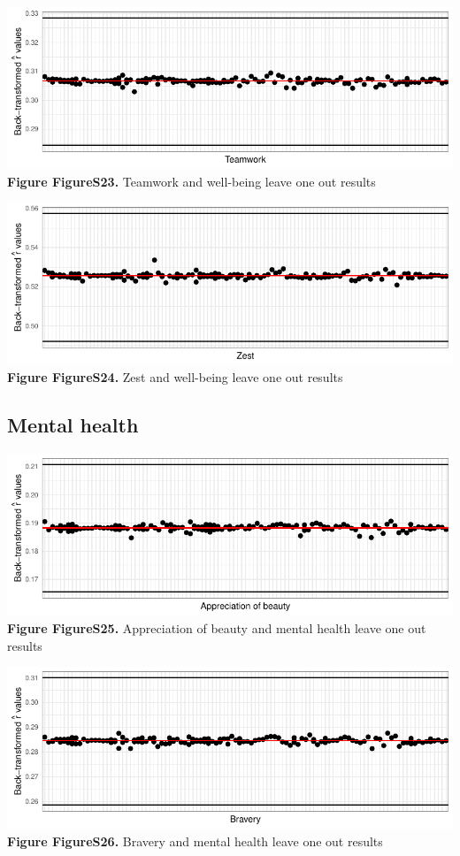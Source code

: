 \documentclass[
  letterpaper,
  DIV=11,
  numbers=noendperiod]{scrartcl}
\begin{document}
\includegraphics{SupplementaryResults_files/figure-pdf/unnamed-chunk-11-23.pdf}\textbf{Figure
FigureS23.} Teamwork and well-being leave one out results

\includegraphics{SupplementaryResults_files/figure-pdf/unnamed-chunk-11-24.pdf}\textbf{Figure
FigureS24.} Zest and well-being leave one out results

\hypertarget{mental-health}{%
\subsection{Mental health}\label{mental-health}}

\includegraphics{SupplementaryResults_files/figure-pdf/unnamed-chunk-12-1.pdf}\textbf{Figure
FigureS25.} Appreciation of beauty and mental health leave one out
results

\includegraphics{SupplementaryResults_files/figure-pdf/unnamed-chunk-12-2.pdf}\textbf{Figure
FigureS26.} Bravery and mental health leave one out results
\end{document}
